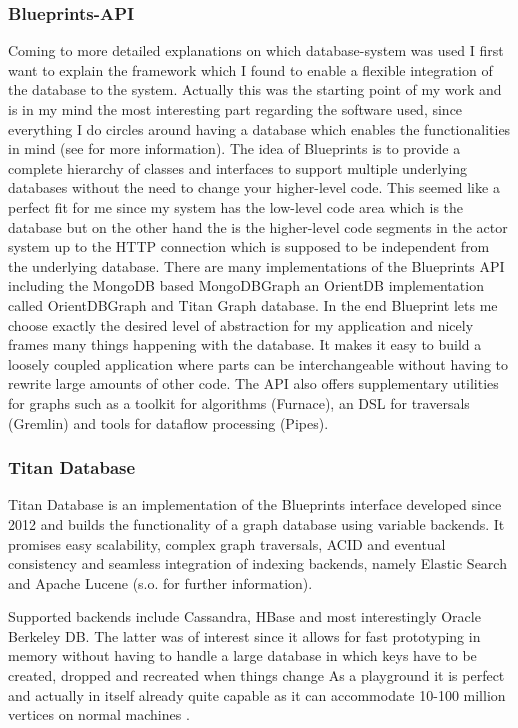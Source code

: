 \documentclass[11p]{scrartcl}
\begin{document}
\subsubsection{Blueprints-API}
Coming to more detailed explanations on which database-system was used I first want to explain the framework which I found to enable a flexible integration of the database to the system.
Actually this was the starting point of my work and is in my mind the most interesting part regarding the software used, since everything I do circles around having a database which enables the functionalities in mind (see \cite{link:blueprints} for more information).
The idea of Blueprints is to provide a complete hierarchy of classes and interfaces to support multiple underlying databases without the need to change your higher-level code. This seemed like a perfect fit for me since my system has the low-level code area which is the database but on the other hand the is the higher-level code segments in the actor system up to the HTTP connection which is supposed to be independent from the underlying database.
There are many implementations of the Blueprints API including the MongoDB based MongoDBGraph an OrientDB implementation called OrientDBGraph and Titan Graph database.
In the end Blueprint lets me choose exactly the desired level of abstraction for my application and nicely frames many things happening with the database. It makes it easy to build a loosely coupled application where parts can be interchangeable without having to rewrite large amounts of other code.
The API also offers supplementary utilities for graphs such as a toolkit for algorithms (Furnace), an DSL for traversals (Gremlin) and tools for dataflow processing (Pipes).


\subsubsection{Titan Database}
Titan Database is an implementation of the Blueprints interface developed since 2012 and builds the functionality of a graph database using variable backends. It promises easy scalability, complex graph traversals, ACID and eventual consistency and seamless integration of indexing backends, namely Elastic Search and Apache Lucene (s.o. \cite{link:titanHome} for further information).

Supported backends include Cassandra, HBase and most interestingly Oracle Berkeley DB. The latter was of interest since it allows for fast prototyping in memory without having to handle a large database in which keys have to be created, dropped and recreated when things change \cite{link:berkeleyDB} As a playground it is perfect and actually in itself already quite capable as it can accommodate 10-100 million vertices on normal machines \cite{link:titanWithBerkeley}.
\end{document}
